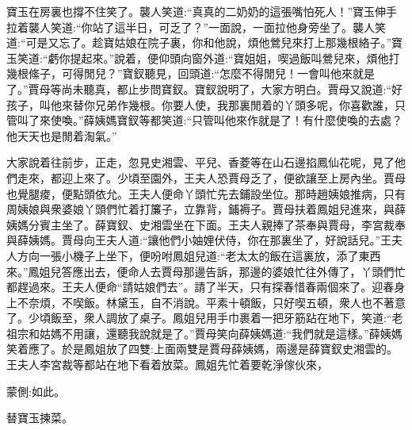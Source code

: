 \begin{parag}
    寶玉在房裏也撐不住笑了。襲人笑道:“真真的二奶奶的這張嘴怕死人！”寶玉伸手拉着襲人笑道:“你站了這半日，可乏了？”一面說，一面拉他身旁坐了。襲人笑道:“可是又忘了。趁寶姑娘在院子裏，你和他說，煩他鶯兒來打上那幾根絡子。”寶玉笑道:“虧你提起來。”說着，便仰頭向窗外道:“寶姐姐，喫過飯叫鶯兒來，煩他打幾根絛子，可得閒兒？”寶釵聽見，回頭道:“怎麼不得閒兒！一會叫他來就是了。”賈母等尚未聽真，都止步問寶釵。寶釵說明了，大家方明白。賈母又說道:“好孩子，叫他來替你兄弟作幾根。你要人使，我那裏閒着的丫頭多呢，你喜歡誰，只管叫了來使喚。”薛姨媽寶釵等都笑道:“只管叫他來作就是了！有什麼使喚的去處？他天天也是閒着淘氣。”
\end{parag}


\begin{parag}
    大家說着往前步，正走，忽見史湘雲、平兒、香菱等在山石邊掐鳳仙花呢，見了他們走來，都迎上來了。少頃至園外，王夫人恐賈母乏了，便欲讓至上房內坐。賈母也覺腿痠，便點頭依允。王夫人便命丫頭忙先去鋪設坐位。那時趙姨娘推病，只有周姨娘與衆婆娘丫頭們忙着打簾子，立靠背，鋪褥子。賈母扶着鳳姐兒進來，與薛姨媽分賓主坐了。薛寶釵、史湘雲坐在下面。王夫人親捧了茶奉與賈母，李宮裁奉與薛姨媽。賈母向王夫人道:“讓他們小妯娌伏侍，你在那裏坐了，好說話兒。”王夫人方向一張小機子上坐下，便吩咐鳳姐兒道:“老太太的飯在這裏放，添了東西來。”鳳姐兒答應出去，便命人去賈母那邊告訴，那邊的婆娘忙往外傳了，丫頭們忙都趕過來。王夫人便命“請姑娘們去”。請了半天，只有探春惜春兩個來了。迎春身上不奈煩，不喫飯。林黛玉，自不消說。平素十頓飯，只好喫五頓，衆人也不著意了。少頃飯至，衆人調放了桌子。鳳姐兒用手巾裹着一把牙筋跕在地下，笑道:“老祖宗和姑媽不用讓，還聽我說就是了。”賈母笑向薛姨媽道:“我們就是這樣。”薛姨媽笑着應了。於是鳳姐放了四雙:上面兩雙是賈母薛姨媽，兩邊是薛寶釵史湘雲的。王夫人李宮裁等都站在地下看着放菜。鳳姐先忙着要乾淨傢伙來，\begin{note}蒙側:如此。\end{note}替寶玉揀菜。
\end{parag}


